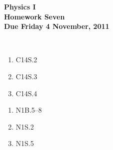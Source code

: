\documentclass[12pt]{article}
\begin{document}
\pagestyle{empty}
 
\begin{center}
{\large {\bf Physics I}}\\
\medskip
{\large {\bf Homework Seven}}\\
\medskip
{ {\bf Due Friday 4  November, 2011}}\\
\end{center}

\hspace{2mm}\\


\begin{enumerate}
\setlength{\itemsep}{-1mm}
  \item C14S.2
  \item C14S.3
  \item C14S.4
\end{enumerate}


\begin{enumerate}
\setlength{\itemsep}{-1mm}
  \item N1B.5--8
  \item N1S.2
  \item N1S.5
\end{enumerate}
\end{document}
